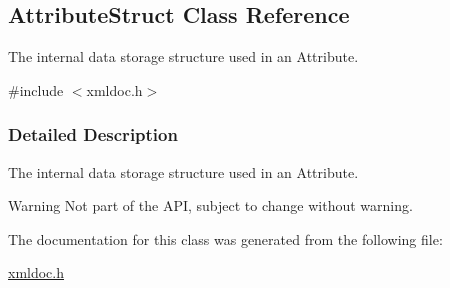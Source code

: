 \hypertarget{classAttributeStruct}{
\subsection{AttributeStruct Class Reference}
\label{classAttributeStruct}
}


The internal data storage structure used in an Attribute.  




{\ttfamily \#include $<$xmldoc.h$>$}



\subsubsection{Detailed Description}
The internal data storage structure used in an Attribute. \begin{DoxyWarning}{Warning}
Not part of the API, subject to change without warning. 
\end{DoxyWarning}


The documentation for this class was generated from the following file:\begin{DoxyCompactItemize}
\item 
\hyperlink{xmldoc_8h}{xmldoc.h}\end{DoxyCompactItemize}
